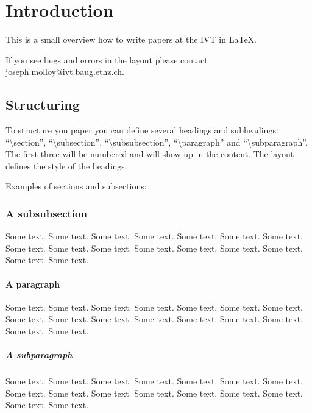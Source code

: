 %
\section{Introduction}
%

This is a small overview how to write papers at the IVT in \LaTeX.

If you see bugs and errors in the layout please contact
joseph.molloy@ivt.baug.ethz.ch.

\subsection{Structuring}

To structure you paper you can define several headings and
subheadings:
``\textbackslash{}section'', ``\textbackslash{}subsection'',
``\textbackslash{}subsubsection'', ``\textbackslash{}paragraph'' and
``\textbackslash{}subparagraph''. The first three will be numbered and
will show
up in the content. The layout defines the style of the headings.

Examples of sections and subsections:

\subsubsection{A subsubsection}

Some text. Some text. Some text. Some text. Some text. Some text. Some
text. Some text. Some text. Some text. Some text. Some text. Some
text. Some text. Some text. Some text.

\paragraph{A paragraph}

Some text. Some text. Some text. Some text. Some text. Some text. Some
text. Some text. Some text. Some text. Some text. Some text. Some
text. Some text. Some text. Some text.

\subparagraph{A subparagraph}

Some text. Some text. Some text. Some text. Some text. Some text. Some
text. Some text. Some text. Some text. Some text. Some text. Some
text. Some text. Some text. Some text.

